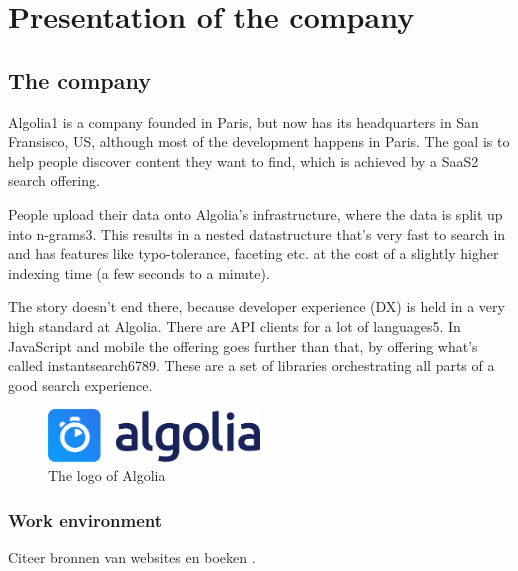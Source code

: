 
\section{Presentation of the company} %
\label{sec:presentation}

\subsection{The company} %
\label{sub:company}

Algolia1 is a company founded in Paris, but now has its headquarters in San Fransisco, US, although most of the development happens in Paris. The goal is to help people discover content they want to find, which is achieved by a SaaS2 search offering.

People upload their data onto Algolia’s infrastructure, where the data is split up into n-grams3. This results in a nested datastructure that’s very fast to search in and has features like typo-tolerance, faceting etc. at the cost of a slightly higher indexing time (a few seconds to a minute).

The story doesn’t end there, because developer experience (DX) is held in a very high standard at Algolia. There are API clients for a lot of languages5. In JavaScript and mobile the offering goes further than that, by offering what’s called instantsearch6789. These are a set of libraries orchestrating all parts of a good search experience.

\begin{figure}[H]
  \label{figure:company-logo}
  \centering
  \includegraphics[width=0.5\textwidth]{../assets/algolia-logo-light.pdf}
  \caption{The logo of Algolia \cite{algolia-press}}
\end{figure}

\subsubsection{Work environment}
\label{sub:work-environment}

Citeer bronnen van websites \cite{voorbeeld-ref} en boeken \cite{boek-ref}.

\lipsum[1]

